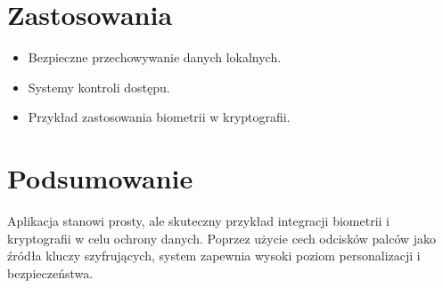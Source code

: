 \documentclass{urdpl}     %
\begin{document}
\section{Zastosowania}
\begin{itemize}
	\item Bezpieczne przechowywanie danych lokalnych.
	\item Systemy kontroli dostępu.
	\item Przykład zastosowania biometrii w kryptografii.
\end{itemize}

\section*{Podsumowanie}
Aplikacja stanowi prosty, ale skuteczny przykład integracji biometrii i kryptografii w celu ochrony danych. Poprzez użycie cech odcisków palców jako źródła kluczy szyfrujących, system zapewnia wysoki poziom personalizacji i bezpieczeństwa.
\end{document}
